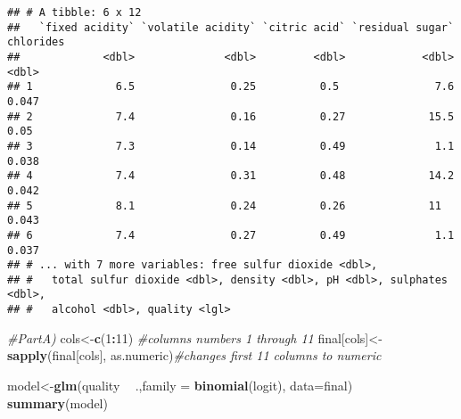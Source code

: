 \documentclass[
]{article}
\newenvironment{Shaded}{\begin{snugshade}}{\end{snugshade}}
\newcommand{\CommentTok}[1]{\textcolor[rgb]{0.56,0.35,0.01}{\textit{#1}}}
\newcommand{\DataTypeTok}[1]{\textcolor[rgb]{0.13,0.29,0.53}{#1}}
\newcommand{\DecValTok}[1]{\textcolor[rgb]{0.00,0.00,0.81}{#1}}
\newcommand{\KeywordTok}[1]{\textcolor[rgb]{0.13,0.29,0.53}{\textbf{#1}}}
\newcommand{\NormalTok}[1]{#1}
\newcommand{\OperatorTok}[1]{\textcolor[rgb]{0.81,0.36,0.00}{\textbf{#1}}}
\newcommand{\StringTok}[1]{\textcolor[rgb]{0.31,0.60,0.02}{#1}}
\begin{document}
\begin{verbatim}
## # A tibble: 6 x 12
##   `fixed acidity` `volatile acidity` `citric acid` `residual sugar` chlorides
##             <dbl>              <dbl>         <dbl>            <dbl>     <dbl>
## 1             6.5               0.25          0.5               7.6     0.047
## 2             7.4               0.16          0.27             15.5     0.05 
## 3             7.3               0.14          0.49              1.1     0.038
## 4             7.4               0.31          0.48             14.2     0.042
## 5             8.1               0.24          0.26             11       0.043
## 6             7.4               0.27          0.49              1.1     0.037
## # ... with 7 more variables: free sulfur dioxide <dbl>,
## #   total sulfur dioxide <dbl>, density <dbl>, pH <dbl>, sulphates <dbl>,
## #   alcohol <dbl>, quality <lgl>
\end{verbatim}

\begin{Shaded}
\begin{Highlighting}[]
\CommentTok{#PartA)}
\NormalTok{cols<-}\KeywordTok{c}\NormalTok{(}\DecValTok{1}\OperatorTok{:}\DecValTok{11}\NormalTok{) }\CommentTok{#columns numbers 1 through 11}
\NormalTok{final[cols]<-}\KeywordTok{sapply}\NormalTok{(final[cols], as.numeric)}\CommentTok{#changes first 11 columns to numeric}



\NormalTok{model<-}\KeywordTok{glm}\NormalTok{(quality }\OperatorTok{~}\StringTok{ }\NormalTok{.,}\DataTypeTok{family =} \KeywordTok{binomial}\NormalTok{(logit), }\DataTypeTok{data=}\NormalTok{final)}
\KeywordTok{summary}\NormalTok{(model)}
\end{Highlighting}
\end{Shaded}
\end{document}
